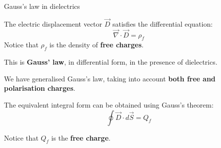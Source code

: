 %
%
%

\begin{frame}{Gauss's law in dielectrics}

The electric displacement vector $\vec{D}$ satisfies the differential equation:
\begin{equation*}
   \vec{\nabla} \cdot \vec{D} = \rho_f
\end{equation*}
Notice that $\rho_f$ is the density of {\bf free charges}.\\

\vspace{0.3cm}

This is {\bf Gauss' law}, in differential form, in the presence of dielectrics.\\

\vspace{0.2cm}

We have generalised Gauss's law, taking into account {\bf both free and polarisation charges}.\\

\vspace{0.2cm}

The equivalent integral form can be obtained using Gauss's theorem:
\begin{equation*}
   \oint \vec{D} \cdot d\vec{S} = Q_f
\end{equation*}

Notice that $Q_f$ is the {\bf free charge}.

\end{frame}


%
%
%

